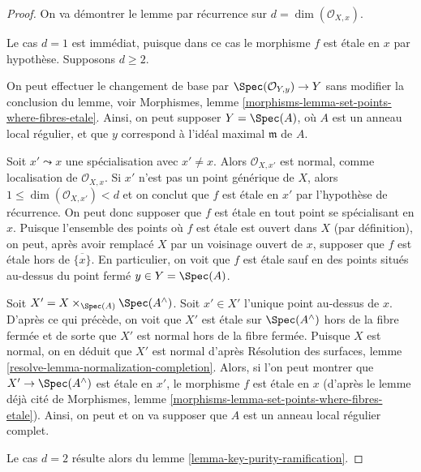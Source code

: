 \begin{proof}
On va démontrer le lemme par récurrence sur $d = \dim(\mathcal{O}_{X, x})$.

\medskip\noindent
Le cas $d = 1$ est immédiat, puisque dans ce cas le morphisme
$f$ est \'etale en $x$ par hypothèse. Supposons $d \geq 2$.

\medskip\noindent
On peut effectuer le changement de base par $\Spec(\mathcal{O}_{Y, y}) \to Y$
sans modifier la conclusion du lemme, voir
Morphismes, lemme \ref{morphisms-lemma-set-points-where-fibres-etale}.
Ainsi, on peut supposer $Y = \Spec(A)$, où $A$ est un anneau local régulier,
et que $y$ correspond à l'idéal maximal $\mathfrak m$ de $A$.

\medskip\noindent
Soit $x' \leadsto x$ une spécialisation avec $x' \not = x$.
Alors $\mathcal{O}_{X, x'}$ est normal, comme localisation de
$\mathcal{O}_{X, x}$. Si $x'$ n'est pas un point générique de $X$,
alors $1 \leq \dim(\mathcal{O}_{X, x'}) < d$ et on conclut que
$f$ est \'etale en $x'$ par l'hypothèse de récurrence.
On peut donc supposer que $f$ est \'etale en tout point se spécialisant en
$x$. Puisque l'ensemble des points où $f$ est \'etale est ouvert dans $X$
(par définition), on peut, après avoir remplacé $X$ par un voisinage ouvert de $x$,
supposer que $f$ est \'etale hors de $\overline{\{x\}}$.
En particulier, on voit que $f$ est \'etale sauf en des points
situés au-dessus du point fermé $y \in Y = \Spec(A)$.

\medskip\noindent
Soit $X' = X \times_{\Spec(A)} \Spec(A^\wedge)$. Soit $x' \in X'$
l'unique point au-dessus de $x$. D'après ce qui précède, on voit que
$X'$ est \'etale sur $\Spec(A^\wedge)$ hors de la fibre fermée et
de sorte que $X'$ est normal hors de la fibre fermée. Puisque $X$ est normal,
on en déduit que $X'$ est normal d'après
Résolution des surfaces, lemme \ref{resolve-lemma-normalization-completion}.
Alors, si l'on peut montrer que $X' \to \Spec(A^\wedge)$ est \'etale en $x'$,
le morphisme $f$ est \'etale en $x$ (d'après le lemme déjà cité de
Morphismes, lemme \ref{morphisms-lemma-set-points-where-fibres-etale}).
Ainsi, on peut et on va supposer que $A$ est un anneau local régulier complet.

\medskip\noindent
Le cas $d = 2$ résulte alors du lemme \ref{lemma-key-purity-ramification}.


\end{proof}
